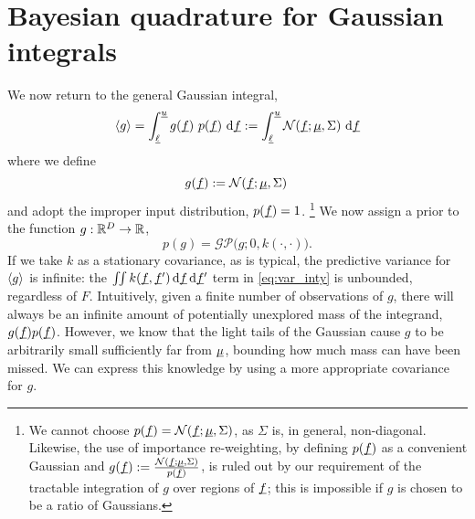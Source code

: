 \documentclass[twoside]{article}
\begin{document}
\section{Bayesian quadrature for Gaussian integrals}

We now return to the general Gaussian integral,
\begin{equation}
 \langle g \rangle=\int_{\underline{\smash{\ell}}}^{\underline{\smash{u}}} g(\underline{\smash{f}})~p(\underline{\smash{f}})~\mathrm{d} \underline{\smash{f}}:= \int_{\underline{\smash{\ell}}}^{\underline{\smash{u}}} \mathcal{N}(\underline{\smash{f}};\underline{\smash{\mu}},\Sigma)~\mathrm{d} \underline{\smash{f}}
\end{equation}
where we define
\begin{equation}
 g(\underline{\smash{f}}) := \mathcal{N}(\underline{\smash{f}};\underline{\smash{\mu}},\Sigma)\,
\end{equation}
and adopt the improper input distribution, $p(\underline{\smash{f}}) = 1$.%
\footnote{
We cannot choose $p(\underline{\smash{f}})=\mathcal{N}(\underline{\smash{f}};\underline{\smash{\mu}},\Sigma)$, as $\Sigma$ is, in general, non-diagonal.
Likewise, the use of importance re-weighting, by defining $p(\underline{\smash{f}})$ as a convenient Gaussian and $g(\underline{\smash{f}}) := \frac{\mathcal{N}(\underline{\smash{f}};\underline{\smash{\mu}},\Sigma)}{p(\underline{\smash{f}})}$, is ruled out by our requirement of the tractable integration of $g$ over regions of $\underline{\smash{f}}$; this is impossible if $g$ is chosen to be a ratio of Gaussians.
} 
We now assign a \gp prior 
to the function $g: \mathbb{R}^D \to \mathbb{R}$,
\begin{equation}
 p(g) = \mathcal{GP}\bigl(g; 0 , k(\cdot,\cdot)\bigr).
\end{equation}
 If we take $k$ as a stationary covariance, as is typical, the predictive variance for $\langle g \rangle$ is infinite: the $\iint k(\underline{\smash{f}},\underline{\smash{f}}')\,\mathrm{d}\underline{\smash{f}}\,\mathrm{d} \underline{\smash{f}}'$ term in \eqref{eq:var_inty} is unbounded, regardless of $F$. 
Intuitively, given a finite number of observations of $g$, there will always be an infinite amount of potentially unexplored mass of the integrand, $g(\underline{\smash{f}})p(\underline{\smash{f}})$. However, we know that the light tails of the Gaussian cause $g$ to be arbitrarily small sufficiently far from $\underline{\smash{\mu}}$, bounding how much mass can have been missed. We can express this knowledge by using a more appropriate covariance for $g$. 
\end{document}
